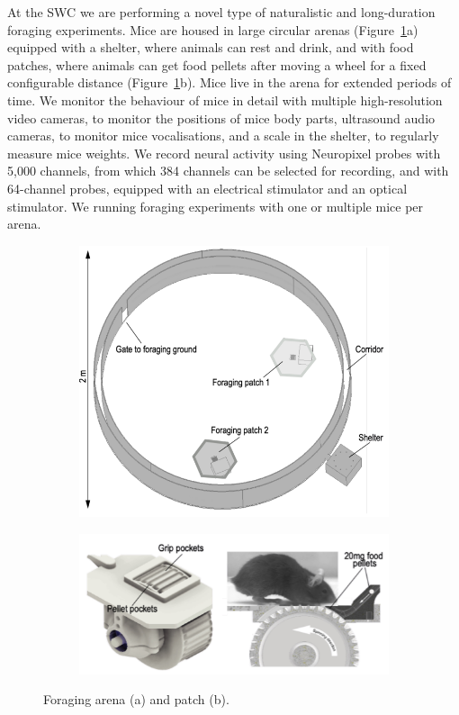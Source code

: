 At the SWC we are performing a novel type of naturalistic and long-duration
foraging experiments. Mice are housed in large circular arenas
(Figure~\ref{fig:arena}a)
equipped with a shelter, where animals can rest and drink, and with food patches,
where animals can get food pellets after moving a wheel for a fixed
configurable distance (Figure~\ref{fig:arena}b). Mice live in the arena for extended periods of time. We
monitor the behaviour of mice in detail with multiple high-resolution video
cameras, to monitor the positions of mice body parts, ultrasound audio cameras,
to monitor mice vocalisations, and a scale in the shelter, to regularly measure
mice weights. We record neural activity using Neuropixel probes with 5,000
channels, from which 384 channels can be selected for recording, and with
64-channel probes, equipped with an electrical stimulator and an optical
stimulator.
%
We running foraging experiments with one or multiple mice per arena.

\begin{figure}
    \begin{subfigure}{\textwidth}
        \centering
        \includegraphics[width=4in]{figures/arena.png}
        \caption{}
    \end{subfigure}
    \par\bigskip
    \begin{subfigure}{\textwidth}
        \centering
        \includegraphics[width=4in]{figures/patch.png}
        \caption{}
    \end{subfigure}
    \caption{Foraging arena (a) and patch (b).}
    \label{fig:arena}
\end{figure}

